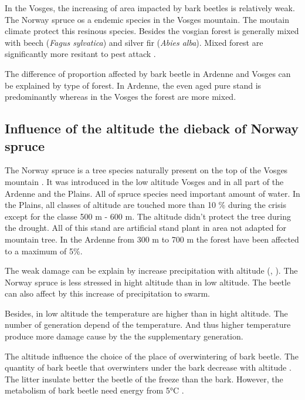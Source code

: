 \documentclass[3p,procedia]{elsarticle}
\begin{document}
In the Vosges, the increasing of area impacted by bark beetles is relatively weak.
The Norway spruce os a endemic species in the Vosges mountain. 
The moutain climate protect this resinous species. 
Besides the vosgian forest is generally mixed with beech (\textit{Fagus sylvatica}) and  silver fir (\textit{Abies alba}). Mixed forest are significantly more resitant to pest attack \citep{jactel_2021}. 

The difference of proportion affected by bark beetle in Ardenne and Vosges can be explained by type of forest.
In Ardenne, the even aged pure stand is predominantly whereas in the Vosges  the forest are more mixed. 

\subsection{Influence of the altitude the dieback of Norway spruce}


The Norway spruce is a tree species naturally present on the top of the Vosges mountain \citep{guinier_trois_1959}. 
It was introduced in the low altitude Vosges and in  all part of the Ardenne and the Plains. 
All of spruce species need important amount of water. 
In the Plains, all classes of altitude are touched more than 10 \% during the crisis except for the classe 500 m - 600 m. 
The altitude didn't protect the tree during the drought. 
All of this stand are artificial stand plant in area not adapted for mountain tree. In the Ardenne from 300 m to 700 m the forest have been affected to a maximum of 5\%. 

The weak damage can be explain by increase precipitation with altitude (\cite{kotlarski_elevation_2012}, \cite{Roe_orographic_preicpitation_2005}).
The Norway spruce is less stressed in hight altitude than in low altitude. 
The beetle can also affect by this increase of precipitation to swarm. 

Besides, in low altitude the temperature are higher than in hight altitude. 
The number of generation depend of the temperature.
And thus higher temperature produce more damage cause by the the supplementary generation. 

The altitude influence the choice of the place of overwintering of  bark beetle.
The quantity of bark beetle that overwinters under the bark decrease with altitude \citep{kasumovic_overwintering_2019}.
The litter insulate better the beetle of the freeze \citep{lombardero_cold_2000} than the bark.
However, the metabolism of bark beetle need energy from 5°C  \citep{kostal_physiological_2011}.
\end{document}
